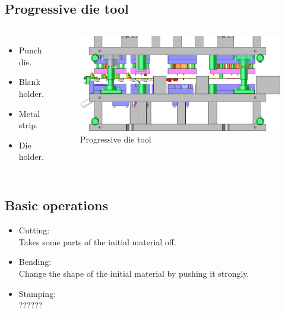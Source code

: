 \documentclass{beamer}
\begin{document}
\subsection{Progressive die tool}
\begin{frame}
    \begin{columns}
        \begin{itemize}
            \item Punch die.
            \item Blank holder.
            \item Metal strip.
            \item Die holder.
        \end{itemize}
        \begin{figure}
            \includegraphics[width=\textwidth]{img/dieTool.jpg}
            \caption{Progressive die tool}
        \end{figure}
    \end{columns}
\end{frame}
\subsection{Basic operations}
\begin{frame}
    \begin{itemize}
        \item Cutting:\\
            Takes some parts of the initial material off.
        \item Bending:\\
            Change the shape of the initial material by pushing it strongly.
        \item Stamping:\\
            ??????
    \end{itemize}
\end{frame}
\end{document}
